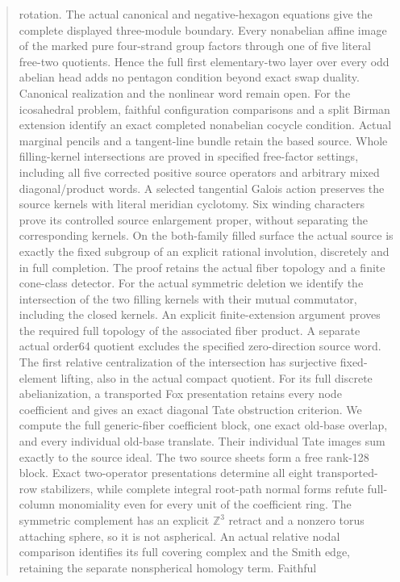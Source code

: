 \documentclass[11pt,a4paper]{article}
\begin{document}
\begin{abstract}
rotation. The actual canonical and negative-hexagon equations give the
complete displayed three-module boundary. Every nonabelian affine
image of the marked pure four-strand group factors through one of five
literal free-two quotients. Hence the full first elementary-two layer
over every odd abelian head adds no pentagon condition beyond exact
swap duality. Canonical realization and the nonlinear word remain open.
For the icosahedral problem, faithful configuration comparisons and a
split Birman extension identify an exact completed nonabelian cocycle
condition. Actual marginal pencils and a tangent-line bundle retain
the based source. Whole filling-kernel intersections are proved in
specified free-factor settings, including all five corrected positive
source operators and arbitrary mixed diagonal/product words. A selected
tangential Galois action preserves the source kernels with literal
meridian cyclotomy. Six winding characters prove its controlled source
enlargement proper, without separating the corresponding kernels.
On the both-family filled surface the actual source is exactly the
fixed subgroup of an explicit rational involution, discretely and in
full completion. The proof retains the actual fiber topology and a
finite cone-class detector. For the actual symmetric deletion we
identify the intersection of the two filling kernels with their mutual
commutator, including the closed kernels. An explicit finite-extension
argument proves the required full topology of the associated fiber
product. A separate actual order64 quotient excludes the specified
zero-direction source word. The first relative centralization of the
intersection has surjective fixed-element lifting, also in the actual
compact quotient. For its full discrete abelianization, a transported
Fox presentation retains every node coefficient and gives an exact
diagonal Tate obstruction criterion. We compute the full generic-fiber
coefficient block, one exact old-base overlap, and every individual
old-base translate. Their individual Tate images sum exactly to the
source ideal. The two source sheets form a free rank-128 block.
Exact two-operator presentations determine all eight transported-row
stabilizers, while complete integral root-path normal forms refute
full-column monomiality even for every unit of the coefficient ring.
The symmetric complement has an explicit $\mathbb Z^3$ retract and a
nonzero torus attaching sphere, so it is not aspherical. An actual
relative nodal comparison identifies its full covering complex and the
Smith edge, retaining the separate nonspherical homology term. Faithful

\end{abstract}
\end{document}
